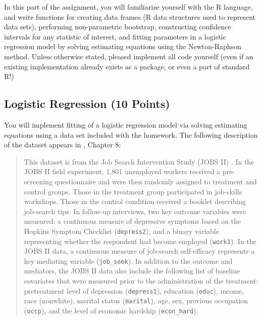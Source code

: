 \documentclass[11pt]{article}
\begin{document}
In this part of the assignment, you will familiarize yourself with the R language, and write functions for creating data frames (R data structures used to represent data sets), performing non-parametric bootstrap, constructing confidence intervals for any statistic of interest, and fitting parameters in a logistic regression model by solving estimating equations using the Newton-Raphson method.  Unless otherwise stated, pleased implement all code yourself (even if an existing implementation already exists as a package, or even a part of standard R!)

\subsection{Logistic Regression (10 Points)}

You will implement fitting of a logistic regression model via solving estimating equations using a data set
included with the homework.  The following description of the dataset appears in
\cite{vinod10advances}, Chapter 8:
\begin{quotation}
This dataset is from the Job Search Intervention Study (JOBS II) \cite{vinokur97mastery}.
In the JOBS II field experiment, 1,801 unemployed workers received a pre-screening
questionnaire and were then randomly assigned to treatment and control
groups.  Those in the treatment group participated in job-skills workshops.
Those in the control condition received a booklet describing job-search tips. In
follow-up interviews, two key outcome variables were measured: a continuous
measure of depressive symptoms based on the Hopkins Symptom Checklist
(\texttt{depress2}), and a binary variable representing whether the respondent had
become employed (\texttt{work1}). In the JOBS II data, a continuous measure of
job-search self-efficacy represents a key mediating variable (\texttt{job\_seek}). In
addition to the outcome and mediators, the JOBS II data also include the
following list of baseline covariates that were measured prior to the administration
of the treatment: pretreatment level of depression (\texttt{depress1}), education
(\texttt{educ}), income, race (nonwhite), marital status (\texttt{marital}), age, sex,
previous occupation (\texttt{occp}), and the level of economic hardship (\texttt{econ\_hard}).
\end{quotation}
\end{document}
